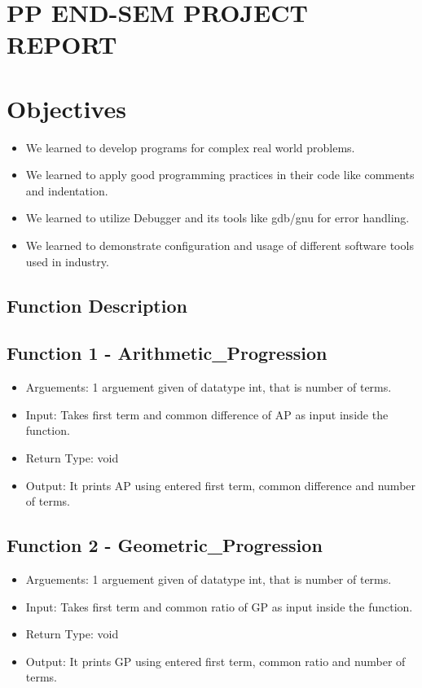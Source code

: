 \documentclass[12pt,a4paper]{article}
\begin{document}
\begin{center}
\section*{\textbf{\Huge PP END-SEM PROJECT REPORT }}
\section*{\textbf{\Large Objectives}}
\end{center}
\begin{itemize}
\item We learned to develop programs for complex real world problems.
\item We learned to apply good programming practices in their code like comments and indentation.
\item We learned to utilize Debugger and its tools like gdb/gnu for error handling.
\item We learned to demonstrate configuration and usage of different software tools used in industry.
\end{itemize}
\pagebreak

\begin{center}
\section*{\textbf{\Large Function Description}}
\end{center}
\subsection*{Function 1 - Arithmetic\_Progression}
\begin{itemize}
\item Arguements: 1 arguement given of datatype int, that is number of terms.
\item Input: Takes first term and common difference of AP as input inside the function.
\item Return Type: void
\item Output: It prints AP using entered first term, common difference and number of terms.
\end{itemize}

\subsection*{Function 2 - Geometric\_Progression}
\begin{itemize}
\item Arguements: 1 arguement given of datatype int, that is number of terms.
\item Input: Takes first term and common ratio of GP as input inside the function.
\item Return Type: void
\item Output: It prints GP using entered first term, common ratio and number of terms.
\end{itemize}
\end{document}
